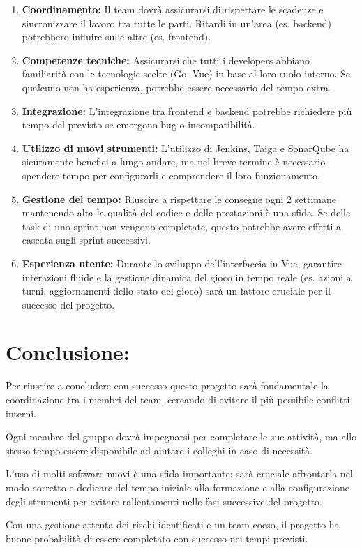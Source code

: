 \documentclass{article}
\begin{document}
\begin{enumerate}
    \item \textbf{Coordinamento:} Il team dovrà assicurarsi di rispettare le scadenze e sincronizzare il lavoro tra tutte le parti. Ritardi in un'area (es. backend) potrebbero influire sulle altre (es. frontend).
   \item \textbf{Competenze tecniche:} Assicurarsi che tutti i developers abbiano familiarità con le tecnologie scelte (Go, Vue) in base al loro ruolo interno. Se qualcuno non ha esperienza, potrebbe essere necessario del tempo extra.
   \item \textbf{Integrazione:} L'integrazione tra frontend e backend potrebbe richiedere più tempo del previsto se emergono bug o incompatibilità.
   \item \textbf{Utilizzo di nuovi strumenti:} L'utilizzo di Jenkins, Taiga e SonarQube ha sicuramente benefici a lungo andare, ma nel breve termine è necessario spendere tempo per configurarli e comprendere il loro funzionamento.
   \item \textbf{Gestione del tempo:} Riuscire a rispettare le consegne ogni 2 settimane mantenendo alta la qualità del codice e delle prestazioni è una sfida. Se delle task di uno sprint non vengono completate, questo potrebbe avere effetti a cascata sugli sprint successivi.
   \item \textbf{Esperienza utente:} Durante lo sviluppo dell'interfaccia in Vue, garantire interazioni fluide e la gestione dinamica del gioco in tempo reale (es. azioni a turni, aggiornamenti dello stato del gioco) sarà un fattore cruciale per il successo del progetto.
\end{enumerate}

\section{Conclusione:}
    Per riuscire a concludere con successo questo progetto sarà fondamentale la coordinazione tra i membri del team, cercando di evitare il più possibile conflitti interni.
    
    Ogni membro del gruppo dovrà impegnarsi per completare le sue attività, ma allo stesso tempo essere disponibile ad aiutare i colleghi in caso di necessità.
    
    L'uso di molti software nuovi è una sfida importante: sarà cruciale affrontarla nel modo corretto e dedicare del tempo iniziale alla formazione e alla configurazione degli strumenti per evitare rallentamenti nelle fasi successive del progetto.
    
    Con una gestione attenta dei rischi identificati e un team coeso, il progetto ha buone probabilità di essere completato con successo nei tempi previsti.
\end{document}
